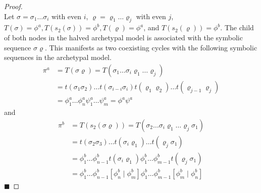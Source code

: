 \begin{proof} \phantom{x} \\
	Let $\sigma = \sigma_1 \dots \sigma_i$ with even $i$, $\varrho = \varrho_1 \dots \varrho_j$ with even $j$, $T(\sigma) = \phi^a, T(s_2(\sigma)) = \phi^b, T(\varrho) = \phi^a$, and $T(s_2(\varrho)) = \phi^b$.
	The child of both nodes in the halved archetypal model is associated with the symbolic sequence $\sigma\varrho$.
	This manifests as two coexisting cycles with the following symbolic sequences in the archetypal model.
	\begin{align*}
		\pi^a & = T(\sigma\varrho) = T(\sigma_1 \dots \sigma_i \varrho_1 \dots \varrho_j)                                 \\
		      & = t(\sigma_1\sigma_2) \dots t(\sigma_{i-i}\sigma_i) t(\varrho_1\varrho_2) \dots t(\varrho_{j-1}\varrho_j) \\
		      & = \phi^a_1 \dots \phi^a_n \psi^a_1 \dots \psi^a_m = \phi^a\psi^a
	\end{align*}
	and
	\begin{align*}
		\pi^b & = T(s_2(\sigma\varrho)) = T(\sigma_2 \dots \sigma_i \varrho_1 \dots \varrho_j \sigma_1)                                           \\
		      & = t(\sigma_2\sigma_3) \dots t(\sigma_i\varrho_1) \dots t(\varrho_j\sigma_1)                                                       \\
		      & = \phi^b_1 \dots \phi^b_{n-1} t(\sigma_i\varrho_1) \phi^b_1 \dots \phi^b_{m-1} t(\varrho_j\sigma_1)                               \\
		      & = \phi^b_1 \dots \phi^b_{n-1} \left[\phi^b_n \mid \phi^b_m\right] \phi^b_1 \dots \phi^b_{m-1} \left[\phi^b_m \mid \phi^b_n\right]
	\end{align*}
	\hfill $\blacksquare$
\end{proof}
